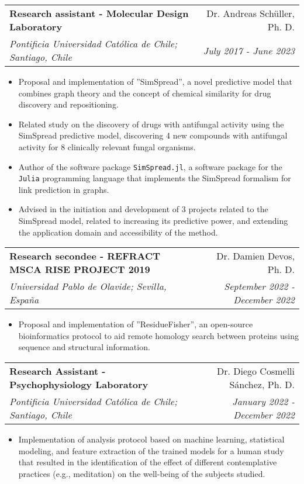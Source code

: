 \documentclass[letter,20pt]{article}
\makeatletter
\newcommand{\resumeSubheading}[4]{
  \vspace{-1pt}\item
    \begin{tabular*}{0.97\textwidth}{l@{\extracolsep{\fill}}r}
      \textbf{#1} & #2 \\
      \textit{#3} & \textit{#4} \\
    \end{tabular*}\vspace{-5pt}
}
\makeatother
\begin{document}
\resumeSubheading{Research assistant - Molecular Design Laboratory}{Dr. Andreas Schüller, Ph. D.}{Pontificia Universidad Católica de Chile; Santiago, Chile}{July 2017 - June 2023}
\vspace{2pt}
\small{
	\begin{itemize}
		\item Proposal and implementation of ''SimSpread'', a novel predictive model that combines graph theory and the concept of chemical similarity for drug discovery and repositioning.
		\item Related study on the discovery of drugs with antifungal activity using the SimSpread predictive model, discovering 4 new compounds with antifungal activity for 8 clinically relevant fungal organisms.
		\item Author of the software package \texttt{SimSpread.jl}, a software package for the \texttt{Julia} programming language that implements the SimSpread formalism for link prediction in graphs.
		\item Advised in the initiation and development of 3 projects related to the SimSpread model, related to increasing its predictive power, and extending the application domain and accessibility of the method.
	\end{itemize}
}

\resumeSubheading{Research secondee - REFRACT MSCA RISE PROJECT 2019}{Dr. Damien Devos, Ph. D.}{Universidad Pablo de Olavide; Sevilla, España}{September 2022 - December 2022}
\vspace{2pt}
\begin{itemize}
	\item Proposal and implementation of ''ResidueFisher'', an open-source bioinformatics protocol to aid remote homology search between proteins using sequence and structural information.
\end{itemize}

\resumeSubheading{Research Assistant - Psychophysiology Laboratory}{Dr. Diego Cosmelli Sánchez, Ph. D.}{Pontificia Universidad Católica de Chile; Santiago, Chile}{January 2022 - December 2022}
\begin{itemize}
	\item Implementation of analysis protocol based on machine learning, statistical modeling, and feature extraction of the trained models for a human study that resulted in the identification of the effect of different contemplative practices (e.g., meditation) on the well-being of the subjects studied.
\end{itemize}
\end{document}
